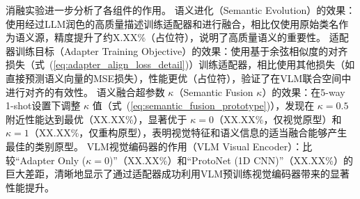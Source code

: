\begin{table}[h!]
\centering
\caption{小样本HRRP识别精度 (\%) 对比 (适配器版本)}
\label{tab:main_results_adapter_semantic}
\end{table}
\captionsetup{skip=5pt}

消融实验进一步分析了各组件的作用。
语义进化（Semantic Evolution）的效果：使用经过LLM润色的高质量描述训练适配器和进行融合，相比仅使用原始类名作为语义源，精度提升了约X.XX\%（占位符），说明了高质量语义的重要性。
适配器训练目标（Adapter Training Objective）的效果：使用基于余弦相似度的对齐损失（式~(\ref{eq:adapter_align_loss_detail})）训练适配器，相比使用其他损失（如直接预测语义向量的MSE损失），性能更优（占位符），验证了在VLM联合空间中进行对齐的有效性。
语义融合超参数 $\kappa$（Semantic Fusion $\kappa$）的效果：在5-way 1-shot设置下调整 $\kappa$ 值（式~(\ref{eq:semantic_fusion_prototype})），发现在 $\kappa=0.5$ 附近性能达到最优（XX.XX\%），显著优于 $\kappa=0$（XX.XX\%，仅视觉原型）和 $\kappa=1$（XX.XX\%，仅重构原型），表明视觉特征和语义信息的适当融合能够产生最佳的类别原型。
VLM视觉编码器的作用（VLM Visual Encoder）：比较“Adapter Only ($\kappa=0$)”（XX.XX\%）和“ProtoNet (1D CNN)”（XX.XX\%）的巨大差距，清晰地显示了通过适配器成功利用VLM预训练视觉编码器带来的显著性能提升。

